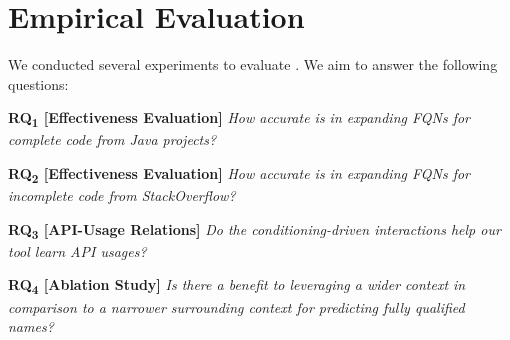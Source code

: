 \section{Empirical Evaluation}
\label{sec:evaluation}


We conducted several experiments to evaluate {\tool}. We aim to answer the following questions:

\vspace{2pt}
\noindent \textbf{RQ\textsubscript{1} 
  [Effectiveness Evaluation]} {\em How accurate is {\tool} in expanding FQNs for complete code from Java projects?}

\vspace{2pt}
\noindent \textbf{RQ\textsubscript{2} 
  [Effectiveness Evaluation]} {\em How accurate is {\tool} in expanding FQNs for incomplete code from StackOverflow?}

\vspace{2pt}
\noindent \textbf{RQ\textsubscript{3}
[API-Usage Relations]} {\em Do the conditioning-driven interactions help our tool learn API usages?}

\vspace{2pt}
\noindent \textbf{RQ\textsubscript{4} 
  [Ablation Study]}  {\em Is there a benefit to leveraging a wider context in comparison to a narrower surrounding context for predicting fully qualified names?}





%
